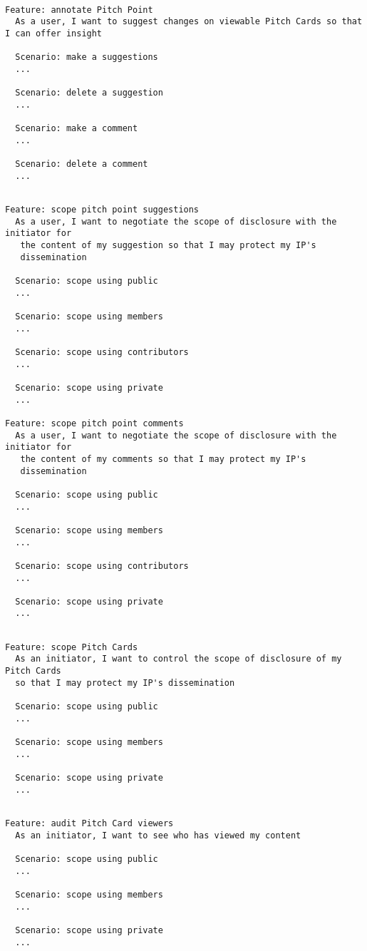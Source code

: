 \begin{verbatim}

Feature: annotate Pitch Point
  As a user, I want to suggest changes on viewable Pitch Cards so that I can offer insight

  Scenario: make a suggestions
  ...

  Scenario: delete a suggestion
  ...

  Scenario: make a comment
  ...

  Scenario: delete a comment
  ...

\end{verbatim}

\begin{verbatim}

Feature: scope pitch point suggestions
  As a user, I want to negotiate the scope of disclosure with the initiator for
   the content of my suggestion so that I may protect my IP's 
   dissemination

  Scenario: scope using public
  ...

  Scenario: scope using members
  ...

  Scenario: scope using contributors
  ...

  Scenario: scope using private
  ...

Feature: scope pitch point comments
  As a user, I want to negotiate the scope of disclosure with the initiator for
   the content of my comments so that I may protect my IP's 
   dissemination

  Scenario: scope using public
  ...

  Scenario: scope using members
  ...

  Scenario: scope using contributors
  ...

  Scenario: scope using private
  ...

\end{verbatim}

\begin{verbatim}

Feature: scope Pitch Cards
  As an initiator, I want to control the scope of disclosure of my Pitch Cards 
  so that I may protect my IP's dissemination

  Scenario: scope using public
  ...

  Scenario: scope using members
  ...

  Scenario: scope using private
  ...

\end{verbatim}

\begin{verbatim}

Feature: audit Pitch Card viewers
  As an initiator, I want to see who has viewed my content 

  Scenario: scope using public
  ...

  Scenario: scope using members
  ...

  Scenario: scope using private
  ...

\end{verbatim}

